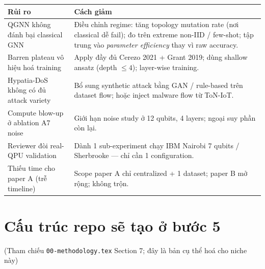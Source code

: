 \documentclass[11pt,a4paper]{article}
\begin{document}
\begin{longtable}{@{}p{4.5cm} p{10.5cm}@{}}
\toprule
\textbf{Rủi ro} & \textbf{Cách giảm} \\
\midrule
\endhead
QGNN không đánh bại classical GNN & Điều chỉnh regime: tăng topology mutation rate (nơi classical dễ fail); đo trên extreme non-IID / few-shot; tập trung vào \textit{parameter efficiency} thay vì raw accuracy. \\
Barren plateau vô hiệu hoá training & Apply đầy đủ Cerezo 2021 + Grant 2019; dùng shallow ansatz (depth $\leq 4$); layer-wise training. \\
Hypatia-DoS không có đủ attack variety & Bổ sung synthetic attack bằng GAN / rule-based trên dataset flow; hoặc inject malware flow từ ToN-IoT. \\
Compute blow-up ở ablation A7 noise & Giới hạn noise study ở 12 qubits, 4 layers; ngoại suy phần còn lại. \\
Reviewer đòi real-QPU validation & Dành 1 sub-experiment chạy IBM Nairobi 7 qubits / Sherbrooke --- chỉ cần 1 configuration. \\
Thiếu time cho paper A (trễ timeline) & Scope paper A chỉ centralized + 1 dataset; paper B mở rộng; không trộn. \\
\bottomrule
\end{longtable}

\section{Cấu trúc repo sẽ tạo ở bước 5}

(Tham chiếu \texttt{00-methodology.tex} Section 7; đây là bản cụ thể hoá cho niche này)
\end{document}
